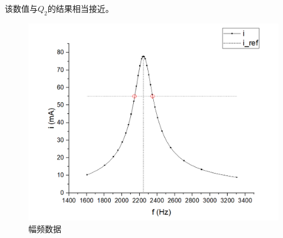 \documentclass{ctexart}
\begin{document}
    该数值与$Q_2$的结果相当接近。

    \begin{figure}[h]
        \includegraphics[width=\textwidth]{rlc_2.png}
        \caption{幅频数据}
    \end{figure}
\end{document}
